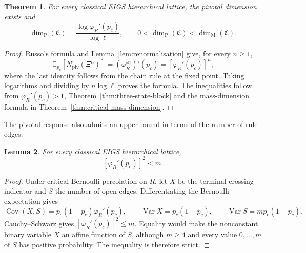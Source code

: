 \documentclass[scheme=plain,11pt]{ctexart}
\newtheorem{theorem}{Theorem}[section]
\newtheorem{lemma}[theorem]{Lemma}
\theoremstyle{definition}
\theoremstyle{remark}
\newcommand{\dimmass}{\dim_{\mathrm M}}
\begin{document}
\begin{theorem}\label{thm:pivotal-dimension}
For every classical EIGS hierarchical lattice, the pivotal dimension exists and
\[
 \dim_{\mathrm P}(\mathfrak C)=\frac{\log\varphi_R'(p_c)}{\log\ell},
 \qquad 0<\dim_{\mathrm P}(\mathfrak C)<\dimmass(\mathfrak C).
\]
\end{theorem}
\begin{proof}
Russo's formula and Lemma~\ref{lem:renormalisation} give, for every $n\ge1$,
\[
 \mathbb E_{p_c}[N_{\mathrm{piv}}(\Xi^n)]
 =(\varphi_R^{\circ n})'(p_c)=[\varphi_R'(p_c)]^n,
\]
where the last identity follows from the chain rule at the fixed point.
Taking logarithms and dividing by $n\log\ell$ proves the formula.
The inequalities follow from $\varphi_R'(p_c)>1$, Theorem~\ref{thm:three-state-block} and the mass-dimension formula in Theorem~\ref{thm:critical-mass-dimension}.
\end{proof}

The pivotal response also admits an upper bound in terms of the number of rule edges.
\begin{lemma}\label{lem:pivotal-response-bound}
For every classical EIGS hierarchical lattice,
\[
 [\varphi_R'(p_c)]^2<m.
\]
\end{lemma}
\begin{proof}
Under critical Bernoulli percolation on $R$, let $X$ be the terminal-crossing indicator and $S$ the number of open edges.
Differentiating the Bernoulli expectation gives
\[
 \operatorname{Cov}(X,S)=p_c(1-p_c)\varphi_R'(p_c),\qquad
 \operatorname{Var}X=p_c(1-p_c),\qquad
 \operatorname{Var}S=mp_c(1-p_c).
\]
Cauchy--Schwarz gives $[\varphi_R'(p_c)]^2\le m$.
Equality would make the nonconstant binary variable $X$ an affine function of $S$, although $m\ge4$ and every value $0,\ldots,m$ of $S$ has positive probability.
The inequality is therefore strict.
\end{proof}
\end{document}
